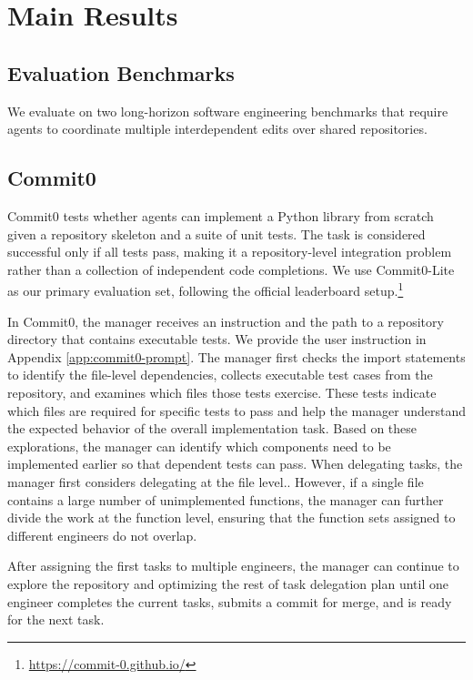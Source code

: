 \section{Main Results}
\label{sec:main-results}
\subsection{Evaluation Benchmarks}
We evaluate \ourmethod on two long-horizon software engineering benchmarks that require agents to coordinate multiple interdependent edits over shared repositories.

\subsection{Commit0}
\label{sec:commit0}
Commit0 \cite{zhao2024commit0} tests whether agents can implement a Python library from scratch given a repository skeleton and a suite of unit tests. The task is considered successful only if all tests pass, making it a repository-level integration problem rather than a collection of independent code completions. We use Commit0-Lite as our primary evaluation set, following the official leaderboard setup.\footnote{\url{https://commit-0.github.io/}} 

In Commit0, the manager receives an instruction and the path to a repository directory that contains executable tests. We provide the user instruction in Appendix \ref{app:commit0-prompt}. The manager first checks the import statements to identify the file-level dependencies, collects executable test cases from the repository, and examines which files those tests exercise. These tests indicate which files are required for specific tests to pass and help the manager understand the expected behavior of the overall implementation task. Based on these explorations, the manager can identify which components need to be implemented earlier so that dependent tests can pass. When delegating tasks, the manager first considers delegating at the file level.. However, if a single file contains a large number of unimplemented functions, the manager can further divide the work at the function level, ensuring that the function sets assigned to different engineers do not overlap.

After assigning the first tasks to multiple engineers, the manager can continue to explore the repository and optimizing the rest of task delegation plan until one engineer completes the current tasks, submits a commit for merge, and is ready for the next task.

